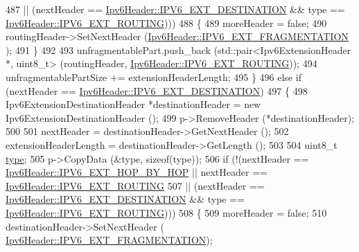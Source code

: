 \begin{DoxyCode}
487                 || (nextHeader == \hyperlink{classns3_1_1Ipv6Header_a226429221a066c5e3b1f260caf27d1e9abfe6e82da1c9945685a3bf9dbfbe974b}{Ipv6Header::IPV6\_EXT\_DESTINATION} && type 
      == \hyperlink{classns3_1_1Ipv6Header_a226429221a066c5e3b1f260caf27d1e9a4f6f9116305705bc2b3d04ff5c4bd2a8}{Ipv6Header::IPV6\_EXT\_ROUTING})))
488             \{
489               moreHeader = \textcolor{keyword}{false};
490               routingHeader->SetNextHeader (\hyperlink{classns3_1_1Ipv6Header_a226429221a066c5e3b1f260caf27d1e9a5839daf3fdfb16dfdc94a208ca6ebc5a}{Ipv6Header::IPV6\_EXT\_FRAGMENTATION}
      );
491             \}
492 
493           unfragmentablePart.push\_back (std::pair<Ipv6ExtensionHeader *, uint8\_t> (routingHeader, 
      \hyperlink{classns3_1_1Ipv6Header_a226429221a066c5e3b1f260caf27d1e9a4f6f9116305705bc2b3d04ff5c4bd2a8}{Ipv6Header::IPV6\_EXT\_ROUTING}));
494           unfragmentablePartSize += extensionHeaderLength;
495         \}
496       \textcolor{keywordflow}{else} \textcolor{keywordflow}{if} (nextHeader == \hyperlink{classns3_1_1Ipv6Header_a226429221a066c5e3b1f260caf27d1e9abfe6e82da1c9945685a3bf9dbfbe974b}{Ipv6Header::IPV6\_EXT\_DESTINATION})
497         \{
498           Ipv6ExtensionDestinationHeader *destinationHeader = \textcolor{keyword}{new} Ipv6ExtensionDestinationHeader ();
499           p->RemoveHeader (*destinationHeader);
500 
501           nextHeader = destinationHeader->GetNextHeader ();
502           extensionHeaderLength = destinationHeader->GetLength ();
503 
504           uint8\_t \hyperlink{visualizer-ideas_8txt_add98db9e15e2a58cf2b57623e7aa893a}{type};
505           p->CopyData (&type, \textcolor{keyword}{sizeof}(type));
506           \textcolor{keywordflow}{if} (!(nextHeader == \hyperlink{classns3_1_1Ipv6Header_a226429221a066c5e3b1f260caf27d1e9aa0413202f88bebb4f91a138e317b6bbd}{Ipv6Header::IPV6\_EXT\_HOP\_BY\_HOP} || nextHeader 
      == \hyperlink{classns3_1_1Ipv6Header_a226429221a066c5e3b1f260caf27d1e9a4f6f9116305705bc2b3d04ff5c4bd2a8}{Ipv6Header::IPV6\_EXT\_ROUTING}
507                 || (nextHeader == \hyperlink{classns3_1_1Ipv6Header_a226429221a066c5e3b1f260caf27d1e9abfe6e82da1c9945685a3bf9dbfbe974b}{Ipv6Header::IPV6\_EXT\_DESTINATION} && type 
      == \hyperlink{classns3_1_1Ipv6Header_a226429221a066c5e3b1f260caf27d1e9a4f6f9116305705bc2b3d04ff5c4bd2a8}{Ipv6Header::IPV6\_EXT\_ROUTING})))
508             \{
509               moreHeader = \textcolor{keyword}{false};
510               destinationHeader->SetNextHeader (
      \hyperlink{classns3_1_1Ipv6Header_a226429221a066c5e3b1f260caf27d1e9a5839daf3fdfb16dfdc94a208ca6ebc5a}{Ipv6Header::IPV6\_EXT\_FRAGMENTATION});

\end{DoxyCode}
